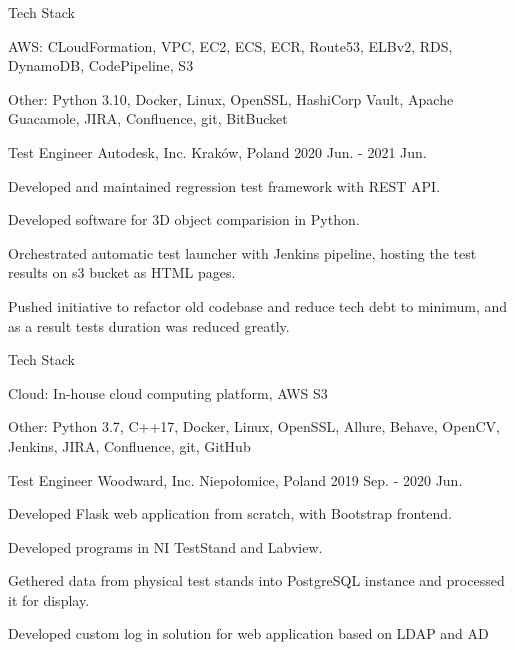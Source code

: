 \begin{cventries}
  \cventry
    {Tech Stack} %
    {}
    {}
    {}
    {
      \begin{cvitems}
        \item {AWS: CLoudFormation, VPC, EC2, ECS, ECR, Route53, ELBv2, RDS, DynamoDB, CodePipeline, S3}
        \item {Other: Python 3.10, Docker, Linux, OpenSSL, HashiCorp Vault, Apache Guacamole, JIRA, Confluence, git, BitBucket}
      \end{cvitems}
    }


  \cventry
    {Test Engineer} %
    {Autodesk, Inc.} %
    {Kraków, Poland} %
    {2020 Jun. - 2021 Jun.} %
    {
      \begin{cvitems} %
        \item {Developed and maintained regression test framework with REST API.}
        \item {Developed software for 3D object comparision in Python.}
        \item {Orchestrated automatic test launcher with Jenkins pipeline, hosting the test results on s3 bucket as HTML pages.}
        \item {Pushed initiative to refactor old codebase and reduce tech debt to minimum, and as a result tests duration was reduced greatly.}
      \end{cvitems}
    }

  \cventry
    {Tech Stack} %
    {}
    {}
    {}
    {
      \begin{cvitems}
        \item {Cloud: In-house cloud computing platform, AWS S3}
        \item {Other: Python 3.7, C++17, Docker, Linux, OpenSSL, Allure, Behave, OpenCV, Jenkins, JIRA, Confluence, git, GitHub}
      \end{cvitems}
    }

  \cventry
    {Test Engineer} %
    {Woodward, Inc.} %
    {Niepołomice, Poland} %
    {2019 Sep. - 2020 Jun.} %
    {
      \begin{cvitems} %
        \item {Developed Flask web application from scratch, with Bootstrap frontend.}
        \item {Developed programs in NI TestStand and Labview.}
        \item {Gethered data from physical test stands into PostgreSQL instance and processed it for display.}
        \item {Developed custom log in solution for web application based on LDAP and AD}
      \end{cvitems}
    }


\end{cventries}

